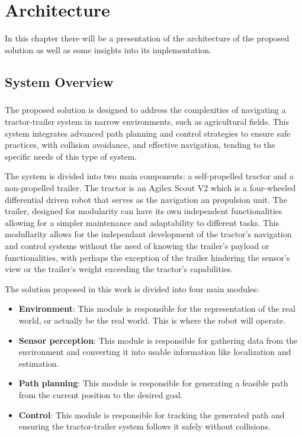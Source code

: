 
%

\chapter{Architecture}
\label{cha:architecture}

In this chapter there will be a presentation of the architecture of the proposed solution as well as some insights into its 
implementation.

\section{System Overview}
\label{sec:systemoverview}
\paragraph{}The proposed solution is designed to address the complexities of navigating a 
tractor-trailer system in narrow environments, such as agricultural fields. This system integrates 
advanced path planning and control strategies to ensure safe practices, with collision avoidance, and 
effective navigation, tending to the specific needs of this type of system.

The system is divided into two main components: a self-propelled tractor and a non-propelled trailer. 
The tractor is an Agilex Scout V2 which is a four-wheeled differential driven robot that serves as the 
navigation an propulsion unit. The trailer, designed for modularity can have its own independent functionalities 
allowing for a simpler maintenance and adaptability to different tasks. This modullarity allows 
for the independant development of the tractor's navigation and control systems without 
the need of knowing the trailer's payload or functionalities, with perhaps the exception 
of the trailer hindering the sensor's view or the trailer's weight exceeding the 
tractor's capabilities.

The solution proposed in this work is divided into four main modules:
\begin{itemize}
    \item \textbf{Environment}: This module is responsible for the representation of the real world, or actually be the real world. This is where the robot will operate.
    \item \textbf{Sensor perception}: This module is responsible for gathering data from the environment and converting it into usable information like localization and estimation.
    \item \textbf{Path planning}: This module is responsible for generating a feasible path from the current position to the desired goal.
    \item \textbf{Control}: This module is responsible for tracking the generated path and ensuring the tractor-trailer system follows it safely without collisions.
\end{itemize}

